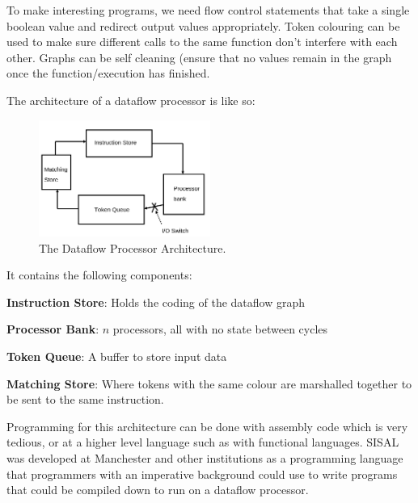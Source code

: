 To make interesting programs, we need flow control statements that
take a single boolean value and redirect output values
appropriately. Token colouring can be used to make sure different
calls to the same function don't interfere with each other. Graphs can
be self cleaning (ensure that no values remain in the graph once the
function/execution has finished.

The architecture of a dataflow processor is like so:

\begin{figure}[H]
  \centering
  \includegraphics[width=0.5\textwidth]{diagrams/dataflow-arch}
  \caption{The Dataflow Processor Architecture.}
\end{figure}

It contains the following components:

\begin{description}
\item \textbf{Instruction Store}: Holds the coding of the dataflow graph
\item \textbf{Processor Bank}: $n$ processors, all with no state between cycles
\item \textbf{Token Queue}: A buffer to store input data
\item \textbf{Matching Store}: Where tokens with the same colour are marshalled
together to be sent to the same instruction.
\end{description}

Programming for this architecture can be done with assembly code which
is very tedious, or at a higher level language such as with functional
languages. SISAL was developed at Manchester and other institutions as
a programming language that programmers with an imperative background
could use to write programs that could be compiled down to run on a
dataflow processor.

{}


